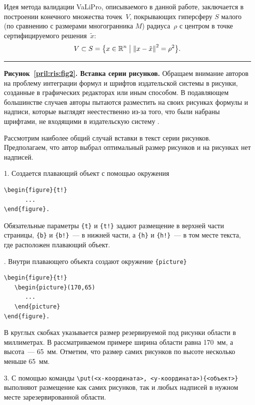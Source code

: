 \documentclass[10pt,a4paper]{book}
\begin{document}
Идея метода валидации VaLiPro, описываемого в данной работе, заключается в 
построении конечного множества точек~$V$, покрывающих гиперсферу $S$ малого 
(по сравнению с размерами многогранника $M$) радиуса~$\rho$ с центром в точке 
сертифицируемого решения~$\tilde x$:
\begin{equation*}
V \subset S = \bigl\{ x \in \mathbb{R}^n \bigm\vert {{\left\| {x - \tilde x} \right\|}^2 = \rho ^2} \bigr\}.
\end{equation*}
\smallskip
\hrule
\bigskip
%
%

\textbf{Рисунок~\ref{pril:ris:fig2}. Вставка серии рисунков.} 
Обращаем внимание авторов на проблему интеграции формул и шрифтов издательской
системы \LaTeXe{} в рисунки, созданные в графических редакторах или
иным способом. В подавляющем большинстве случаев авторы пытаются
разместить на своих рисунках формулы и надписи, которые выглядят
неестественно из-за того, что были набраны шрифтами, не входящими в
издательскую систему \LaTeXe{}.

Рассмотрим наиболее общий случай вставки в текст серии рисунков. 
Предполагаем, что автор выбрал оптимальный размер рисунков и на рисунках нет
надписей. 

1. Создается плавающий объект с помощью окружения
\begin{verbatim}
\begin{figure}{t!}
      ...
\end{figure}.
\end{verbatim}
Обязательные параметры \verb+{t}+ и \verb+{t!}+ задают размещение в верхней 
части страницы, \verb+{b}+ и \verb+{b!}+~--- в нижней части, 
а \verb+{h}+ и \verb+{h!}+~--- в том месте текста, где расположен плавающий объект.

. Внутри плавающего объекта создают окружение \verb!{picture}!
\begin{verbatim}
\begin{figure}{t!}
   \begin{picture}(170,65)
      ...
   \end{picture}
\end{figure}.
\end{verbatim}
В круглых скобках указывается размер резервируемой под рисунки области в миллиметрах.
В рассматриваемом примере ширина области равна 170~мм, а высота~--- 65~мм. Отметим,
что размер самих рисунков по высоте несколько меньше 65~мм.

3. С помощью команды \verb!\put(<x-координата>, <y-координата>){<объект>}! выполняют
размещение как самих рисунков, так и любых надписей в нужном месте зарезервированной 
области. 
\end{document}
